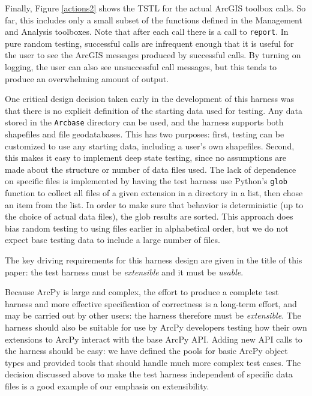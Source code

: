 Finally, Figure \ref{actions2} shows the TSTL for the actual
ArcGIS toolbox calls.  So far, this includes only a small subset of
the functions defined in the Management and Analysis toolboxes.  Note
that after each call there is a call to {\tt report}.  In pure random
testing, successful calls are infrequent enough that it is useful
for the user to see the ArcGIS messages produced by successful calls.
By turning on logging, the user can also see unsuccessful call
messages, but this tends to produce an overwhelming amount of output.

One critical design decision taken early in the development of this
harness was that there is no explicit definition of the starting data
used for testing.  Any data stored in the {\tt Arcbase} directory can
be used, and the harness supports both shapefiles and file geodatabases.
This has two purposes:  first, testing can be customized to use any
starting data, including a user's own shapefiles.  Second, this makes
it easy to implement deep state testing, since no assumptions are made
about the structure or number of data files used.  The lack of
dependence on specific files is implemented by having the test harness
use Python's {\tt glob} function to collect all files of a given
extension in a directory in a list, then chose an item from the list.
In order to make sure that behavior is deterministic (up to the choice
of actual data files), the glob results are sorted.  This approach
does bias random testing to using files earlier in alphabetical order,
but we do not expect base testing data to include a large number of
files.

The key driving requirements for this harness design are given in the
title of this paper:  the test harness must be \emph{extensible} and
it must be \emph{usable}.

Because ArcPy is large and complex, the effort to produce a
complete test harness and more effective specification of correctness
is a long-term effort, and may be carried out by other users:  the
harness therefore must be \emph{extensible}.  The
harness should also be suitable for use by ArcPy developers testing
how their own extensions to ArcPy interact with the base ArcPy API.
Adding new API calls to the harness should be easy:  we have defined
the pools for basic ArcPy object types and provided tools that should
handle much more complex test cases.  The decision discussed above to
make the test harness independent of specific data files is a good
example of our emphasis on extensibility.

